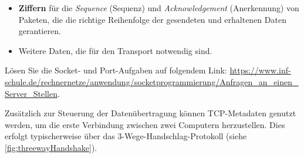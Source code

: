 \begin{itemize}
\begin{table}[H]
\begin{tabular}{c||c|c}
			      \bottomrule
		      \end{tabular}
		      \caption{Gängige \gls{TCP}-Ports, Anwendungen und deren Verwendung}
		      \label{tab:tcpPorts}
	      \end{table}
	      Sowohl der \textit{Client} wie auch der \textit{Server} versehen die Daten mit jeweils einer Zahl, die für den Ursprungs-Port (\textit{Source Port}), respektive den Ziel-Port (\textit{Destination Port}) stehen.
	\item \textbf{Ziffern} für die \textit{Sequence} (Sequenz) und \textit{Acknowledgement} (Anerkennung) von Paketen, die die richtige Reihenfolge der gesendeten und erhaltenen Daten gerantieren.
	\item Weitere Daten, die für den Transport notwendig sind.
\end{itemize}

\begin{mychallenge}
	Lösen Sie die Socket- und Port-Aufgaben auf folgendem Link: \url{https://www.inf-schule.de/rechnernetze/anwendung/socketprogrammierung/Anfragen_an_einen_Server_Stellen}.
\end{mychallenge}

Zusätzlich zur Steuerung der Datenübertragung können \gls{TCP}-Metadaten genutzt werden, um die erste Verbindung zwischen zwei Computern herzustellen. Dies erfolgt typischerweise über das 3-Wege-Handschlag-Protokoll (siehe \cref{fig:threewayHandshake}).


